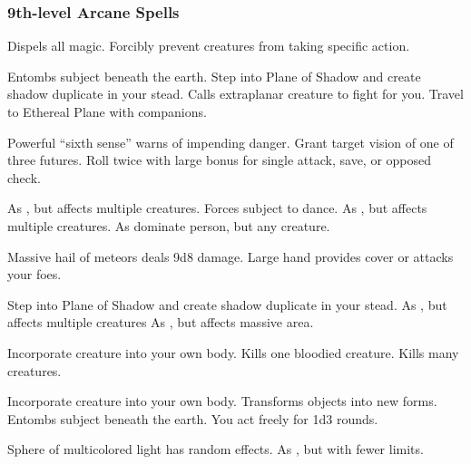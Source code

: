 \subsubsection{9th-level Arcane Spells} 
\begin{swspelllist}
     Dispels all magic.
     Forcibly prevent creatures from taking specific action.

   Entombs subject beneath the earth.
   Step into Plane of Shadow and create shadow duplicate in your stead.
   Calls extraplanar creature to fight for you.
   Travel to Ethereal Plane with companions.

   Powerful ``sixth sense'' warns of impending danger.
   Grant target vision of one of three futures.
   Roll twice with large bonus for single attack, save, or opposed check.

   As , but affects multiple creatures.
   Forces subject to dance.
   As , but affects multiple creatures.
   As dominate person, but any creature.

   Massive hail of meteors deals 9d8 damage.
  \spellhead{}
   Large hand provides cover or attacks your foes.

   Step into Plane of Shadow and create shadow duplicate in your stead.
   As , but affects multiple creatures
   As , but affects massive area.

   Incorporate creature into your own body.
   Kills one bloodied creature.
   Kills many creatures.

   Incorporate creature into your own body.
   Transforms objects into new forms.
   Entombs subject beneath the earth.
   You act freely for 1d3 rounds.

   Sphere of multicolored light has random effects.
  \M As , but with fewer limits.
\end{swspelllist}


